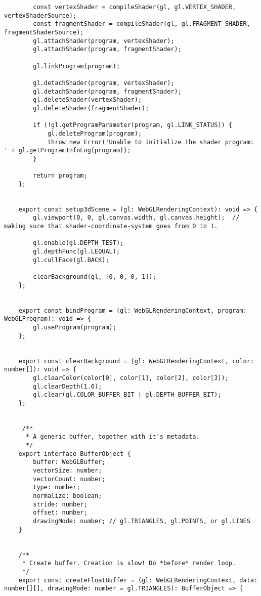 \begin{lstlisting}
        const vertexShader = compileShader(gl, gl.VERTEX_SHADER, vertexShaderSource);
        const fragmentShader = compileShader(gl, gl.FRAGMENT_SHADER, fragmentShaderSource);
        gl.attachShader(program, vertexShader);
        gl.attachShader(program, fragmentShader);
    
        gl.linkProgram(program);
    
        gl.detachShader(program, vertexShader);
        gl.detachShader(program, fragmentShader);
        gl.deleteShader(vertexShader);
        gl.deleteShader(fragmentShader);
    
        if (!gl.getProgramParameter(program, gl.LINK_STATUS)) {
            gl.deleteProgram(program);
            throw new Error('Unable to initialize the shader program: ' + gl.getProgramInfoLog(program));
        }
    
        return program;
    };
    
    
    export const setup3dScene = (gl: WebGLRenderingContext): void => {
        gl.viewport(0, 0, gl.canvas.width, gl.canvas.height);  // making sure that shader-coordinate-system goes from 0 to 1.
    
        gl.enable(gl.DEPTH_TEST);
        gl.depthFunc(gl.LEQUAL);
        gl.cullFace(gl.BACK);
    
        clearBackground(gl, [0, 0, 0, 1]);
    };
    
    
    export const bindProgram = (gl: WebGLRenderingContext, program: WebGLProgram): void => {
        gl.useProgram(program);
    };
    
    
    export const clearBackground = (gl: WebGLRenderingContext, color: number[]): void => {
        gl.clearColor(color[0], color[1], color[2], color[3]);
        gl.clearDepth(1.0);
        gl.clear(gl.COLOR_BUFFER_BIT | gl.DEPTH_BUFFER_BIT);
    };
    
    
     /**
      * A generic buffer, together with it's metadata.
      */
    export interface BufferObject {
        buffer: WebGLBuffer;
        vectorSize: number;
        vectorCount: number;
        type: number;
        normalize: boolean;
        stride: number;
        offset: number;
        drawingMode: number; // gl.TRIANGLES, gl.POINTS, or gl.LINES
    }
    
    
    /**
     * Create buffer. Creation is slow! Do *before* render loop.
     */
    export const createFloatBuffer = (gl: WebGLRenderingContext, data: number[][], drawingMode: number = gl.TRIANGLES): BufferObject => {
    

\end{lstlisting}
